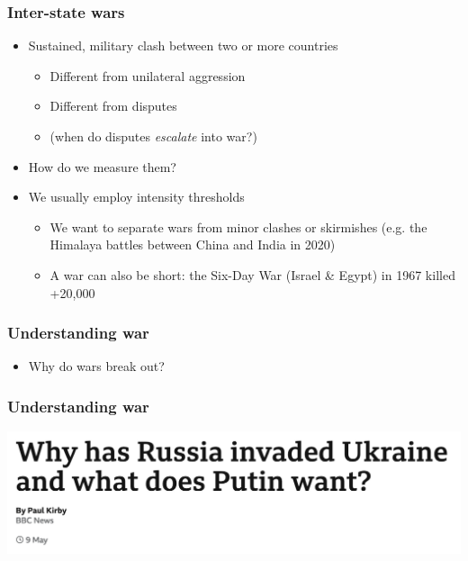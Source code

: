 \documentclass[aspectratio=43]{beamer}
\begin{document}
\begin{frame}
\frametitle{Inter-state wars}
\centering

\begin{itemize}
\item<1-> Sustained, military clash between two or more countries
  \begin{itemize}
  \item Different from unilateral aggression
  \item Different from disputes
  \item[] (when do disputes \textit{escalate} into war?)
  \end{itemize}
\item<2-> How do we measure them?
\item<2->[] We usually employ intensity thresholds
  \begin{itemize}
  \item We want to separate wars from minor clashes or skirmishes (e.g. the Himalaya battles between China and India in 2020)
  \item A war can also be short: the Six-Day War (Israel \& Egypt) in 1967 killed +20,000
  \end{itemize}
\end{itemize}

\end{frame}


\begin{frame}
\frametitle{Understanding war}
\centering

\begin{itemize}[<+->]
  \item Why do wars break out?
\end{itemize}

\end{frame}

\begin{frame}
\frametitle{Understanding war}
\centering

\includegraphics[width = \textwidth]{img/why_russia}

\end{frame}
\end{document}
